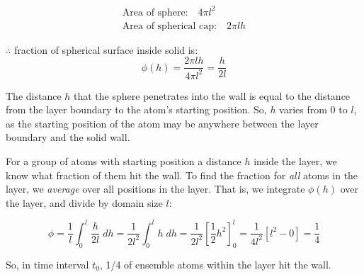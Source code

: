 \documentclass[a4paper]{report}
\begin{document}
\begin{center}
\end{center}

\begin{align*}
\text{Area of sphere:} \quad 4 \pi l^2 \\
\text{Area of spherical cap:} \quad 2 \pi l h
\end{align*}

$\therefore$ fraction of spherical surface inside solid is:
\begin{equation}
\phi(h) = \frac{2 \pi l h}{4 \pi l^{2}} = \frac{h}{2l}
\end{equation}

The distance $h$ that the sphere penetrates into the wall is equal to the distance from the layer boundary to the atom's starting position.  So, $h$ varies from 0 to $l$, as the starting position of the atom may be anywhere between the layer boundary and the solid wall.

For a group of atoms with starting position a distance $h$ inside the layer, we know what fraction of them hit the wall.
To find the fraction for \emph{all} atoms in the layer, we \emph{average} over all positions in the layer. That is, we integrate $\phi(h)$ over the layer, and divide by domain size $l$:

\begin{equation}
\phi = \frac{1}{l}\int_{0}^{l} \frac{h}{2l} \; dh = \frac{1}{2l^{2}} \int_{0}^{l} h \;dh = 
\frac{1}{2l^{2}} [\frac{1}{2} h^{2}]_{0}^{l} =
\frac{1}{4l^{2}}[l^{2} - 0] = \frac{1}{4}
\end{equation}


So, in time interval $t_{0}$, 1/4 of ensemble atoms within the layer hit the wall.
\end{document}
